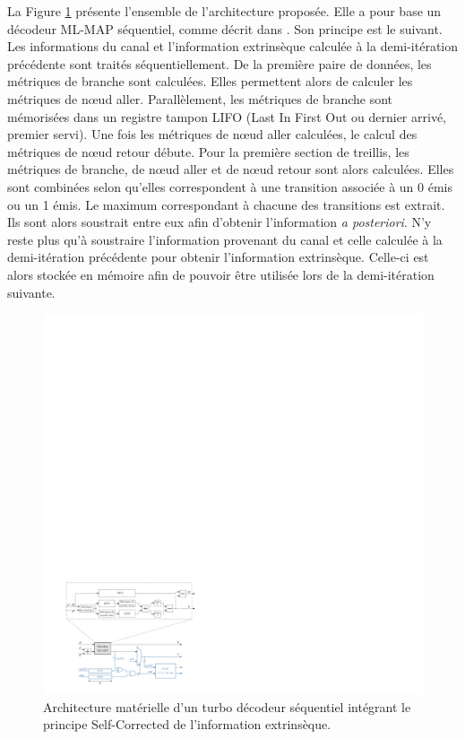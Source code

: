 La Figure \ref{fig:sc_arch} présente l'ensemble de l'architecture proposée. Elle a pour base un décodeur ML-MAP séquentiel, 
comme décrit dans \cite{livre_declercq}. Son principe est le suivant. Les 
informations du canal et l'information extrinsèque calculée à la demi-itération précédente sont traités séquentiellement. De 
la première paire de données, les métriques de branche sont calculées. Elles permettent alors de calculer les métriques 
de nœud aller. Parallèlement, les métriques de branche sont mémorisées dans un registre tampon LIFO (Last In First Out ou 
dernier arrivé, premier servi). Une fois les métriques de nœud aller calculées, le calcul des métriques de nœud retour débute. 
Pour la première section de treillis, les métriques de branche, de nœud aller et de nœud retour sont alors calculées. 
Elles sont combinées selon qu'elles correspondent à une transition associée à un 0 émis ou un 1 émis. Le maximum 
correspondant à chacune des transitions est extrait. Ils sont alors soustrait entre eux afin d'obtenir l'information \textit{a posteriori}. N'y reste plus qu'à soustraire l'information provenant du canal et celle calculée à la demi-itération 
précédente pour obtenir l'information extrinsèque. Celle-ci est alors stockée en mémoire afin 
de pouvoir être utilisée lors de la demi-itération suivante.

\begin{figure}[!t]
	\centering
	\includegraphics[width=\textwidth]{main/ch2_fig/ipe/sc_arch4.pdf}
	\vspace*{.3cm}
	\caption{\label{fig:sc_arch}Architecture matérielle d'un turbo décodeur séquentiel intégrant le principe Self-Corrected de l'information 
	extrinsèque.}
\end{figure}

